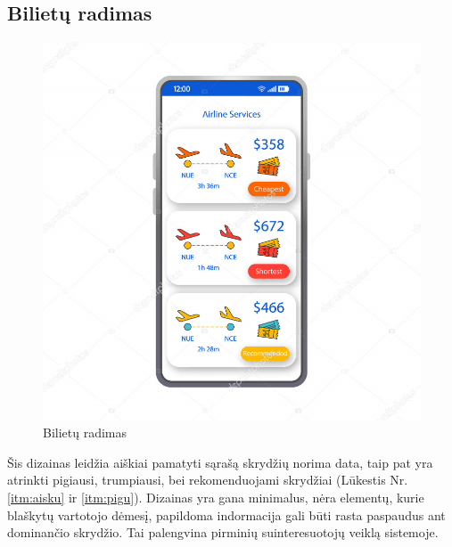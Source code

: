 \documentclass{VUMIFPSkursinis}
\begin{document}
\subsection{Bilietų radimas}
\begin{figure}[H]
    \centering
    \includegraphics[scale=0.8]{img/deposit.png}
    \caption{Bilietų radimas}
    \label{img:radimas1}
\end{figure}
Šis dizainas leidžia aiškiai pamatyti sąrašą skrydžių norima data, taip pat yra atrinkti pigiausi, trumpiausi, bei rekomenduojami skrydžiai  (Lūkestis Nr. \ref{itm:aisku} ir  \ref{itm:pigu}). Dizainas yra gana minimalus, nėra elementų, kurie blaškytų vartotojo dėmesį, papildoma indormacija gali būti rasta paspaudus ant dominančio skrydžio. Tai palengvina pirminių suinteresuotojų veiklą sistemoje.

\newpage
\end{document}
